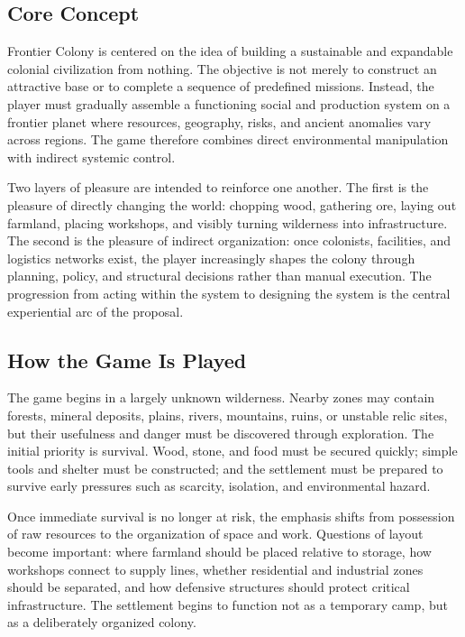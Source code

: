 \documentclass[conference]{IEEEtran}
\begin{document}
\subsection{Core Concept}
Frontier Colony is centered on the idea of building a sustainable and expandable colonial civilization from nothing. The objective is not merely to construct an attractive base or to complete a sequence of predefined missions. Instead, the player must gradually assemble a functioning social and production system on a frontier planet where resources, geography, risks, and ancient anomalies vary across regions. The game therefore combines direct environmental manipulation with indirect systemic control.

Two layers of pleasure are intended to reinforce one another. The first is the pleasure of directly changing the world: chopping wood, gathering ore, laying out farmland, placing workshops, and visibly turning wilderness into infrastructure. The second is the pleasure of indirect organization: once colonists, facilities, and logistics networks exist, the player increasingly shapes the colony through planning, policy, and structural decisions rather than manual execution. The progression from acting within the system to designing the system is the central experiential arc of the proposal.

\subsection{How the Game Is Played}
The game begins in a largely unknown wilderness. Nearby zones may contain forests, mineral deposits, plains, rivers, mountains, ruins, or unstable relic sites, but their usefulness and danger must be discovered through exploration. The initial priority is survival. Wood, stone, and food must be secured quickly; simple tools and shelter must be constructed; and the settlement must be prepared to survive early pressures such as scarcity, isolation, and environmental hazard.

Once immediate survival is no longer at risk, the emphasis shifts from possession of raw resources to the organization of space and work. Questions of layout become important: where farmland should be placed relative to storage, how workshops connect to supply lines, whether residential and industrial zones should be separated, and how defensive structures should protect critical infrastructure. The settlement begins to function not as a temporary camp, but as a deliberately organized colony.
\end{document}

